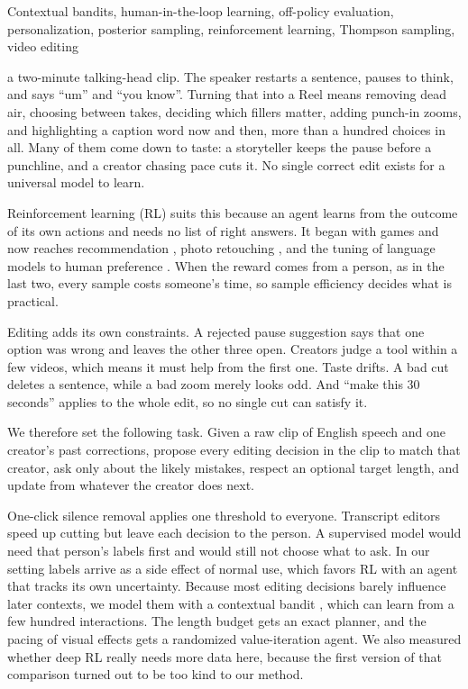 \documentclass{ieeeaccess}
\begin{document}
\begin{keywords}
Contextual bandits, human-in-the-loop learning, off-policy evaluation, personalization, posterior sampling, reinforcement learning, Thompson sampling, video editing
\end{keywords}

\titlepgskip=-15pt

\maketitle

 a two-minute talking-head clip. The speaker restarts a sentence, pauses to think, and says ``um'' and ``you know''. Turning that into a Reel means removing dead air, choosing between takes, deciding which fillers matter, adding punch-in zooms, and highlighting a caption word now and then, more than a hundred choices in all. Many of them come down to taste: a storyteller keeps the pause before a punchline, and a creator chasing pace cuts it. No single correct edit exists for a universal model to learn.

Reinforcement learning (RL) \cite{sutton2018} suits this because an agent learns from the outcome of its own actions and needs no list of right answers. It began with games \cite{mnih2015} and now reaches recommendation \cite{li2010,zheng2018,chen2019}, photo retouching \cite{hu2018exposure}, and the tuning of language models to human preference \cite{christiano2017,ouyang2022}. When the reward comes from a person, as in the last two, every sample costs someone's time, so sample efficiency decides what is practical.

Editing adds its own constraints. A rejected pause suggestion says that one option was wrong and leaves the other three open. Creators judge a tool within a few videos, which means it must help from the first one. Taste drifts. A bad cut deletes a sentence, while a bad zoom merely looks odd. And ``make this 30 seconds'' applies to the whole edit, so no single cut can satisfy it.

We therefore set the following task. Given a raw clip of English speech and one creator's past corrections, propose every editing decision in the clip to match that creator, ask only about the likely mistakes, respect an optional target length, and update from whatever the creator does next.

One-click silence removal applies one threshold to everyone. Transcript editors \cite{berthouzoz2012,rubin2013,huber2019} speed up cutting but leave each decision to the person. A supervised model would need that person's labels first and would still not choose what to ask. In our setting labels arrive as a side effect of normal use, which favors RL with an agent that tracks its own uncertainty. Because most editing decisions barely influence later contexts, we model them with a contextual bandit \cite{li2010,chu2011}, which can learn from a few hundred interactions. The length budget gets an exact planner, and the pacing of visual effects gets a randomized value-iteration agent. We also measured whether deep RL \cite{mnih2015,schulman2017} really needs more data here, because the first version of that comparison turned out to be too kind to our method.
\end{document}
